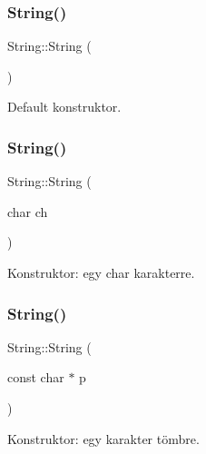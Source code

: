 \subsubsection{\texorpdfstring{String()}{String()}\hspace{0.1cm}{\footnotesize\ttfamily [1/4]}}
{\footnotesize\ttfamily String\+::\+String (\begin{DoxyParamCaption}{ }\end{DoxyParamCaption})\hspace{0.3cm}{\ttfamily [inline]}}



Default konstruktor. 

\mbox{\label{class_string_a62a77180f8df2547e8be1313654abcee}} 
\subsubsection{\texorpdfstring{String()}{String()}\hspace{0.1cm}{\footnotesize\ttfamily [2/4]}}
{\footnotesize\ttfamily String\+::\+String (\begin{DoxyParamCaption}\item[{char}]{ch }\end{DoxyParamCaption})}



Konstruktor\+: egy char karakterre. 

\mbox{\label{class_string_a09ca4f1436a83ecb1c273a836b7cd4c6}} 
\subsubsection{\texorpdfstring{String()}{String()}\hspace{0.1cm}{\footnotesize\ttfamily [3/4]}}
{\footnotesize\ttfamily String\+::\+String (\begin{DoxyParamCaption}\item[{const char $\ast$}]{p }\end{DoxyParamCaption})}



Konstruktor\+: egy karakter tömbre. 

\mbox{\label{class_string_a3c682dc983b45bdbb7f3858fe4cbf221}} 
